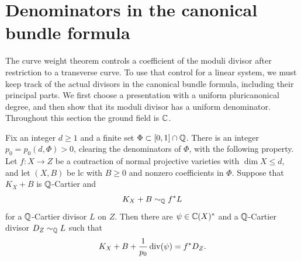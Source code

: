 \section{Denominators in the canonical bundle formula}\label{sec:fibration}

The curve weight theorem controls a coefficient of the moduli divisor after
restriction to a transverse curve.  To use that control for a linear system,
we must keep track of the actual divisors in the canonical bundle formula,
including their principal parts.  We first choose a presentation with a
uniform pluricanonical degree, and then show that its moduli divisor has a
uniform denominator.  Throughout this section the ground field is $\mathbb C$.

\begin{proposition}\label{prop:exact-presentation}
Fix an integer $d\geq 1$ and a finite set
$\Phi\subset [0,1]\cap\mathbb Q$.  There is an integer $p_0=p_0(d,\Phi)>0$,
clearing the denominators of $\Phi$, with the following property.
Let $f:X\to Z$ be a contraction of normal projective varieties with
$\dim X\leq d$, and let $(X,B)$ be lc with $B\geq0$ and nonzero
coefficients in $\Phi$.  Suppose that $K_X+B$ is $\mathbb Q$-Cartier and
\[
 K_X+B\sim_{\mathbb Q} f^*L
\]
for a $\mathbb Q$-Cartier divisor $L$ on $Z$.  Then there are
$\psi\in\mathbb C(X)^*$ and a $\mathbb Q$-Cartier divisor $D_Z\sim_{\mathbb Q} L$ such that
\begin{equation}\label{eq:exact-presentation}
 K_X+B+\frac{1}{p_0}\operatorname{div}(\psi)=f^*D_Z.
\end{equation}
\end{proposition}

